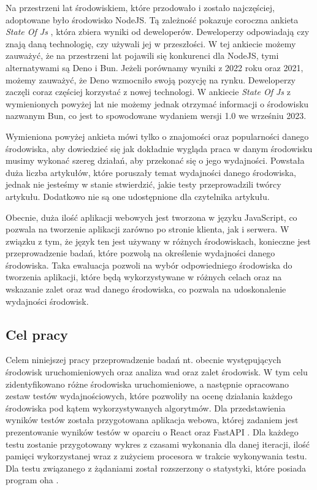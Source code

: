 Na przestrzeni lat środowiskiem, które przodowało i zostało najczęściej, adoptowane było środowisko NodeJS. Tą zależność pokazuje coroczna ankieta \textit{State Of Js} \cite{State_of_js:2021} \cite{State_of_js:2022}, która zbiera wyniki od deweloperów. Deweloperzy odpowiadają czy znają daną technologię, czy używali jej w przeszłości. W tej ankiecie możemy zauważyć, że na przestrzeni lat pojawili się konkurenci dla NodeJS, tymi alternatywami są Deno i Bun. Jeżeli porównamy wyniki z 2022 roku oraz 2021, możemy zauważyć, że Deno wzmocniło swoją pozycję na rynku. Deweloperzy zaczęli coraz częściej korzystać z nowej technologi. W ankiecie \textit{State Of Js} \cite{State_of_js:2021} \cite{State_of_js:2022} z wymienionych powyżej lat nie możemy jednak otrzymać informacji o środowisku nazwanym Bun, co jest to spowodowane wydaniem wersji 1.0 we wrześniu 2023.

Wymieniona powyżej ankieta mówi tylko o znajomości oraz popularności danego środowiska, aby dowiedzieć się jak dokładnie wygląda praca w danym środowisku musimy wykonać szereg działań, aby przekonać się o jego wydajności. Powstała duża liczba artykułów, które poruszały temat wydajności danego środowiska, jednak nie jesteśmy w stanie stwierdzić, jakie testy przeprowadzili twórcy artykułu. Dodatkowo nie są one udostępnione dla czytelnika artykułu.

Obecnie, duża ilość aplikacji webowych jest tworzona w języku JavaScript, co pozwala na tworzenie aplikacji zarówno po stronie klienta, jak i serwera. W związku z tym, że język ten jest używany w różnych środowiskach, konieczne jest przeprowadzenie badań, które pozwolą na określenie wydajności danego środowiska. Taka ewaluacja pozwoli na wybór odpowiedniego środowiska do tworzenia aplikacji, które będą wykorzystywane w różnych celach oraz na wskazanie zalet oraz wad danego środowiska, co pozwala na udoskonalenie wydajności środowisk.  

\subsection{Cel pracy}
Celem niniejszej pracy przeprowadzenie badań nt. obecnie występujących środowisk uruchomieniowych oraz analiza wad oraz zalet środowisk. W tym celu zidentyfikowano różne środowiska uruchomieniowe, a następnie opracowano zestaw testów wydajnościowych, które pozwoliły na ocenę działania każdego środowiska pod kątem wykorzystywanych algorytmów. Dla przedstawienia wyników testów  została przygotowana aplikacja webowa, której zadaniem jest prezentowanie wyników testów w oparciu o React \cite{React} oraz FastAPI \cite{FastAPI}. Dla każdego testu zostanie przygotowany wykres z czasami wykonania dla danej iteracji, ilość pamięci wykorzystanej wraz z zużyciem procesora w trakcie wykonywania testu. Dla testu związanego z żądaniami  został rozszerzony o statystyki, które posiada program oha \cite{oha}.

